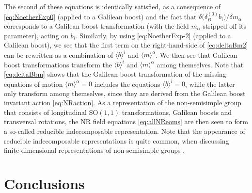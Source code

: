 \documentclass[a4paper,10pt,openany]{article}
\begin{document}
	The second of these equations is identically satisfied, as a consequence of \eqref{eq:NoetherExp0} (applied to a Galilean boost) and the fact that $\delta \big(\delta_B^{(0)} b_i\big)/\delta m_\alpha$ corresponds to a Galilean boost transformation (with the field $m_\alpha$ stripped off its parameter), acting on $b_i$. Similarly, by using \eqref{eq:NoetherExp-2} (applied to a Galilean boost), we see that the first term on the right-hand-side of \eqref{eq:deltaBm2} can be rewritten as a combination of $\langle b \rangle^i$ and $\langle m \rangle^\alpha$. We then see that Galilean boost transformations transform the $\langle b \rangle^i$ and $\langle m \rangle^\alpha$ among themselves. Note that \eqref{eq:deltaBbm} shows that the Galilean boost transformation of the missing equations of motion $\langle m \rangle^\alpha = 0$ includes the equations $\langle b \rangle^i = 0$, while the latter only transform among themselves, since they are derived from the Galilean boost invariant action \eqref{eq:NRaction}. As a representation of the non-semisimple group that consists of longitudinal SO$(1,1)$ transformations, Galilean boosts and transversal rotations, the NR field equations \eqref{eq:allNReoms} are then seen to form a so-called reducible indecomposable representation. Note that the appearance of reducible indecomposable representations is quite common, when discussing finite-dimensional representations of non-semisimple groups \cite{George-Levy-Nahas}.
	
	
	\section{Conclusions} \label{sec:conclusions}
	
\end{document}
